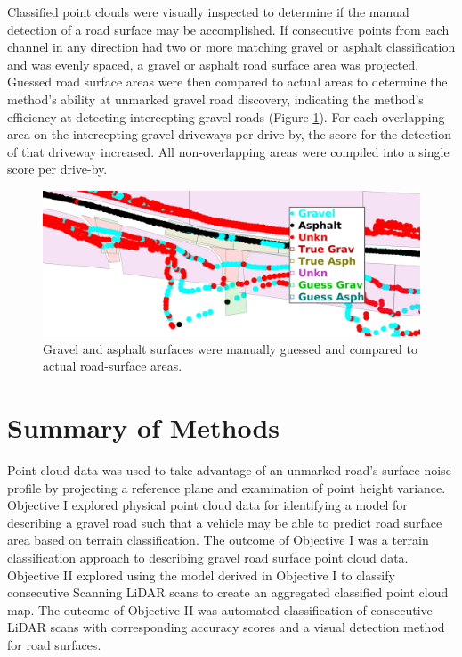 \documentclass[numbered,pdftex]{ohio-etd}
\begin{document}
{{{{{				{Classified point clouds were visually inspected to determine if the manual detection of a road surface may be accomplished. If consecutive points from each channel in any direction had two or more matching gravel or asphalt classification and was evenly spaced, a gravel or asphalt road surface area was projected. Guessed road surface areas were then compared to actual areas to determine the method's ability at unmarked gravel road discovery, indicating the method's efficiency at detecting intercepting gravel roads (Figure \ref{fig:rm_db_4_toc}). For each overlapping area on the intercepting gravel driveways per drive-by, the score for the detection of that driveway increased. All non-overlapping areas were compiled into a single score per drive-by.}	
				
				\begin{figure}[H]
					\centering
					\includegraphics[width=0.9\linewidth]{Defense_Images/rm_db_4_overlap_reredux}
					\caption[Projected Guess vs Truth]{Gravel and asphalt surfaces were manually guessed and compared to actual road-surface areas. }
					\label{fig:rm_db_4_toc}
				\end{figure}	
	
			}
		
		} %

	} %
	
} %


\newpage
	
	
	\section{Summary of Methods}\label{sec:summary-of-methods}
	{
		
		{Point cloud data was used to take advantage of an unmarked road's surface noise profile by projecting a reference plane and examination of point height variance. Objective I explored physical point cloud data for identifying a model for describing a gravel road such that a vehicle may be able to predict road surface area based on terrain classification. The outcome of Objective I was a terrain classification approach to describing gravel road surface point cloud data. Objective II explored using the model derived in Objective I to classify consecutive Scanning LiDAR scans to create an aggregated classified point cloud map. The outcome of Objective II was automated classification of consecutive LiDAR scans with corresponding accuracy scores and a visual detection method for road surfaces.}
		 
}}
\end{document}
